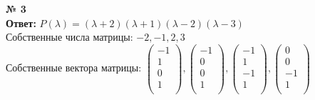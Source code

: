 \documentclass[a4paper, 12pt]{article}
\newenvironment{task}[1][0]{\vspace{.5cm} {\textbf{№ #1} \vspace{.5cm}\\ }}{}
\begin{document}
\begin{task}[3]
\vspace{.5cm}
\textbf{Ответ:} $P(\lambda)=(\lambda+2)(\lambda+1)(\lambda-2)(\lambda-3)$\\
Собственные числа матрицы: $-2, -1, 2, 3$\\
Собственные вектора матрицы: 
$\begin{pmatrix}-1\\1\\0\\1\\\end{pmatrix}, \begin{pmatrix}-1\\0\\0\\1\\\end{pmatrix}, \begin{pmatrix}-1\\1\\-1\\1\\\end{pmatrix},
\begin{pmatrix}0\\0\\-1\\1\\\end{pmatrix}$
\end{task}
\end{document}
